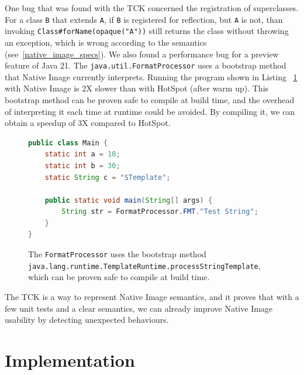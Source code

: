 One bug that was found with the TCK concerned the registration of superclasses. For a class \verb|B| that extends \verb|A|, if \verb|B| is registered for reflection, but \verb|A| is not, than invoking \verb|Class#forName(opaque("A"))| still returns the class without throwing an exception, which is wrong according to the semantics (see~\ref{native_image_specs}). 
We also found a performance bug for a preview feature of Java 21. The \verb|java.util.FormatProcessor| uses a bootstrap method that Native Image currently interprets. Running the program shown in Listing ~\ref{fig:format_processor} with Native Image is 2X slower than with HotSpot (after warm up). This bootstrap method can be proven safe to compile at build time, and the overhead of interpreting it each time at runtime could be avoided. By compiling it, we can obtain a speedup of 3X compared to HotSpot.

\begin{figure}[ht]
    \centering
\begin{lstlisting}[language=Java]
public class Main {
    static int a = 10;
    static int b = 30;
    static String c = "STemplate";

    public static void main(String[] args) {
        String str = FormatProcessor.FMT."Test String";
    }
}
\end{lstlisting}
    \caption{The \texttt{FormatProcessor} uses the bootstrap method \texttt{java.lang.runtime.TemplateRuntime.processStringTemplate}, which can be proven safe to compile at build time. }
    \label{fig:format_processor}
\end{figure}

The TCK is a way to represent Native Image semantics, and it proves that with a few unit tests and a clear semantics, we can already improve Native Image usability by detecting unexpected behaviours.


\chapter{Implementation}

